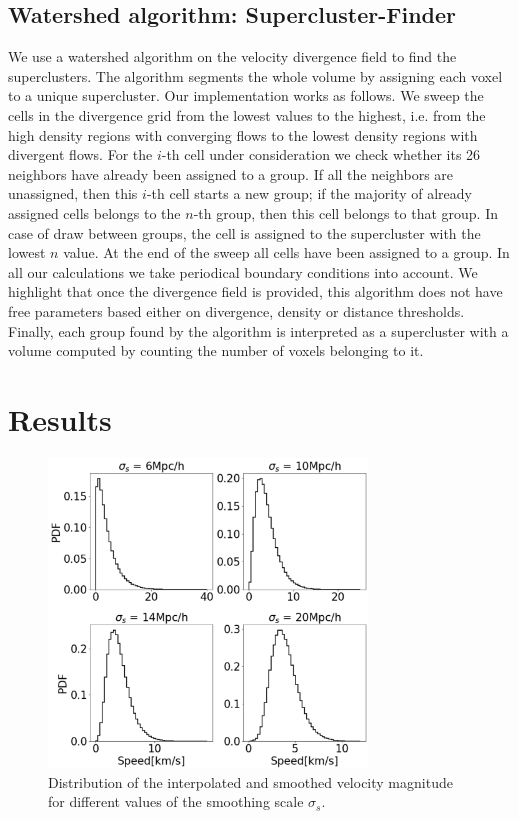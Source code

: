 \documentclass[usenatbib]{mnras}
\begin{document}
\subsection{Watershed algorithm: Supercluster-Finder}

We use a watershed algorithm \citep{BeucherWatershed1979} on the velocity divergence field to find the
superclusters.
The algorithm segments the whole volume by assigning each voxel to a unique supercluster. 
Our implementation works as follows. 
We sweep the cells in the divergence grid from the lowest values to the highest, i.e. from
the high density regions with converging flows to the lowest density regions with divergent
flows.
For the $i$-th cell under consideration we check whether its 26 neighbors have already been assigned to a group. 
If all the neighbors are unassigned, then this $i$-th cell starts a
new group; if the majority of already assigned cells belongs to the
$n$-th group, then this cell belongs to that group.
In case of draw between groups, the cell is assigned to the supercluster with the lowest $n$ value.
At the end of the sweep all cells have been assigned to a group. 
In all our calculations we take periodical boundary conditions into
account.  
We highlight that once the divergence field is provided, this algorithm
does not have free parameters based either on divergence, density or distance thresholds. 
Finally, each group found by the algorithm is interpreted as a supercluster 
with a volume computed by counting the number of voxels belonging to it.

\section{Results}



\begin{figure}
    \centering
    \includegraphics[width=240pt]{smooth_vel_dist.pdf}
    \caption{Distribution of the interpolated and smoothed velocity
      magnitude for different values of the smoothing scale $\sigma_{s}$.}
    \label{fig:smooth_vel_dist}
\end{figure}
\end{document}
